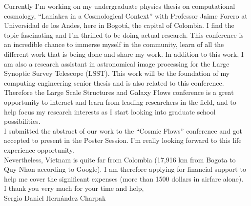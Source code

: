 \documentclass[12pt]{article}
\begin{document}
Currently I’m working on my undergraduate physics thesis on computational cosmology, “Laniakea in a Cosmological Context” with Professor Jaime Forero 
at Universidad de los Andes, here in Bogotá, the capital of Colombia. I find the topic fascinating and I’m thrilled to be doing actual research.  
This conference is an incredible chance to immerse myself in the community, learn of all the different work that is being done and share my work. 
In addition to this work, I am also a research assistant in astronomical image processing for the Large Synoptic Survey Telescope (LSST). 
This work will be the foundation of my computing engineering senior thesis and is also related to this conference. 
Therefore the Large Scale Structures and Galaxy Flows conference is a great opportunity to interact and learn from leading researchers in the field, and to help focus my research interests as I start looking into graduate school possibilities.\\
I submitted the abstract of our work to the “Cosmic Flows” conference and got accepted to present in the Poster Session. I’m really looking forward to this life experience opportunity. \\
Nevertheless, Vietnam is quite far from Colombia (17,916 km from Bogota to Quy Nhon according to Google). I am therefore applying for financial support to help me cover the significant expenses (more than 1500 dollars in airfare alone). \\
I thank you very much for your time and help,\\
Sergio Daniel Hernández Charpak
\end{document}
